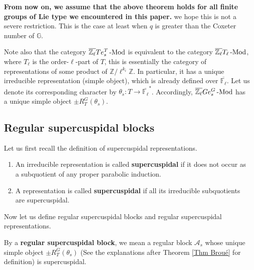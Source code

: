 		\textbf{From now on, we assume that the above theorem holds for all finite groups of Lie type we encountered in this paper.} we hope this is not a severe restriction. This is the case at least when $q$ is greater than the Coxeter number of $\mathbb{G}$.
		
		Note also that the category $\overline{\mathbb{Z}_\ell}Te_s^T\operatorname{-Mod}$ is equivalent to the category $\overline{\mathbb{Z}_\ell}T_{\ell}\operatorname{-Mod}$, where $T_{\ell}$ is the order-$\ell$-part of $T$, this is essentially the category of representations of some product of $\mathbb{Z}/\ell^{k_i}\mathbb{Z}$. In particular, it has a unique irreducible representation (simple object), which is already defined over $\overline{\mathbb{F}_{\ell}}$. Let us denote its corresponding character by $\theta_s: T \to \overline{\mathbb{F}_{\ell}}^*$. Accordingly, $\overline{\mathbb{Z}_\ell}Ge_s^G\operatorname{-Mod}$ has a unique simple object $\pm R_T^G(\theta_s)$.
		
		

		\subsection{Regular supercuspidal blocks}
		
		Let us first recall the definition of supercuspidal representations.
		
		\begin{definition}\label{Def supercuspidal}
			
			\begin{enumerate}
				\item An irreducible representation is called \textbf{supercuspidal} if it does not occur as a subquotient of any proper parabolic induction.
				\item A representation is called \textbf{supercuspidal} if all its irreducible subquotients are supercuspidal.
			\end{enumerate}
		\end{definition}
		
		Now let us define regular supercuspidal blocks and regular supercuspidal representations.
		
		\begin{definition}\label{Definition regular supercuspidal block}
			By a \textbf{regular supercuspidal block}, we mean a regular block $\mathcal{A}_s$ whose unique simple object $\pm R_T^G(\theta_s)$ (See the explanations after Theorem \ref{Thm Broué} for definition) is supercuspidal.
		\end{definition}
		
